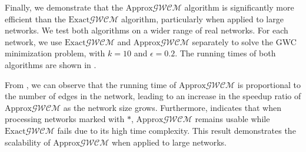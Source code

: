\documentclass[10pt,twocolumn,twoside]{IEEEtran}
\begin{document}
Finally, we demonstrate that the \(\text{Approx}\mathcal{GWCM}\) algorithm is significantly more efficient than the \(\text{Exact}\mathcal{GWCM}\) algorithm, particularly when applied to large networks.
We test both algorithms on a wider range of real networks.
For each network, we use \(\text{Exact}\mathcal{GWCM}\) and \(\text{Approx}\mathcal{GWCM}\) separately to solve the GWC minimization problem, with \(k=10\) and \(\epsilon=0.2\).
The running times of both algorithms are shown in .

From , we can observe that the running time of \(\text{Approx}\mathcal{GWCM}\) is proportional to the number of edges in the network, leading to an increase in the speedup ratio of \(\text{Approx}\mathcal{GWCM}\) as the network size grows.
Furthermore,  indicates that when processing networks marked with \(\ast\),
\(\text{Approx}\mathcal{GWCM}\) remains usable while \(\text{Exact}\mathcal{GWCM}\) fails due to its high time complexity.
This result demonstrates the scalability of \(\text{Approx}\mathcal{GWCM}\) when applied to large networks.
\end{document}
